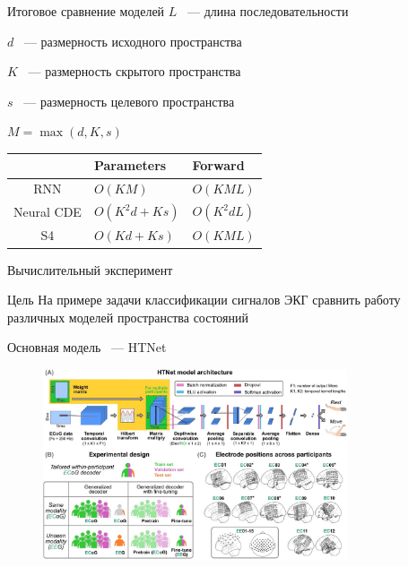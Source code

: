 \documentclass[10pt,pdf,hyperref={unicode}]{beamer}
\begin{document}
\begin{frame}{Итоговое сравнение моделей}
	$L$ ~--- длина последовательности
	
	$d$ ~--- размерность исходного пространства
	
	$K$ ~--- размерность скрытого пространства
	
	$s$ ~--- размерность целевого пространства
	
	$M = \max(d, K, s)$  
	
	\begin{table}
		\begin{tabular}{c|l|l|}
			\cline{2-3}
			\multicolumn{1}{l|}{}             & Parameters & Forward \\ \hline
			\multicolumn{1}{|c|}{RNN}         & $O(KM)$ & $O(KML)$ \\ \hline
			\multicolumn{1}{|c|}{Neural CDE}  & $O(K^2d + Ks)$ & $O(K^2dL)$ \\ \hline
			\multicolumn{1}{|c|}{S4}          & $O(Kd + Ks)$ & $O(KML)$ \\ \hline
		\end{tabular}
	\end{table}
\end{frame}
\begin{frame}{Вычислительный эксперимент}
	\begin{alertblock}{Цель}
		 На примере задачи классификации сигналов ЭКГ сравнить работу различных моделей пространства состояний
	\end{alertblock}

	Основная модель ~--- HTNet
	
	\begin{figure}
		\includegraphics[width=0.8\textwidth]{htnet.png}
	\end{figure}

\end{frame}
\end{document}
